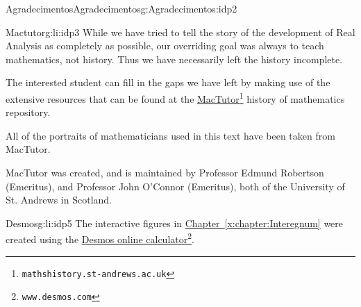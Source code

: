 \begin{acknowledgement}{Agradecimentos}{}{Agradecimentos}{}{}{g:Agradecimentos:idp2}
	\begin{descriptionlist}
		\begin{dlimedium}{Mactutor}{g:li:idp3}%
			While we have tried to tell the story of the development of Real Analysis as completely as possible, our overriding goal was always to teach mathematics, not history. Thus we have necessarily left the history incomplete.%
			\par
			The interested student can fill in the gaps we have left by making use of the extensive resources that can be found at the \href{https://mathshistory.st-andrews.ac.uk/}{MacTutor}\footnote{\nolinkurl{mathshistory.st-andrews.ac.uk}\label{g:fn:idp4}} history of mathematics repository.%
			\par
			All of the portraits of mathematicians used in this text have been taken from MacTutor.%
			\par
			MacTutor was created, and is maintained by Professor Edmund Robertson (Emeritus), and Professor John O'Connor (Emeritus), both of the University of St. Andrews in Scotland.%
		\end{dlimedium}%
		\begin{dlimedium}{Desmos}{g:li:idp5}%
			The interactive figures in \hyperref[x:chapter:Interegnum]{Chapter~{\xreffont\ref{x:chapter:Interegnum}}} were created using the \href{https://www.desmos.com/}{Desmos online calculator}\footnote{\nolinkurl{www.desmos.com}\label{g:fn:idp6}}.%
		\end{dlimedium}%
	\end{descriptionlist}
\end{acknowledgement}